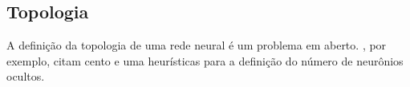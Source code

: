 \subsection{Topologia}
A definição da topologia de uma rede neural é um problema em aberto.
\cite{sheela2013review}, por exemplo, citam cento e uma heurísticas para a definição do
número de neurônios ocultos.



% 
% 


